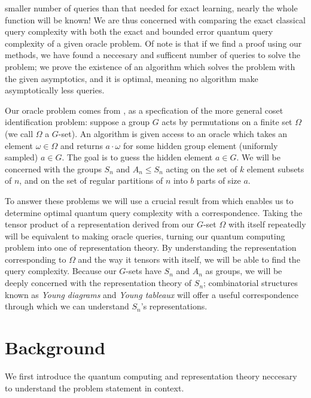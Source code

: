 \documentclass[12pt,twoside]{reedthesis}
\theoremstyle{plain}   %
\theoremstyle{definition}
\theoremstyle{remark}
\numberwithin{equation}{section}
\begin{document}
  smaller number of queries than that needed for exact learning, nearly the whole function will be known!
  We are thus concerned with comparing the exact classical query complexity with both the exact and bounded error quantum query complexity of a given oracle problem.
  Of note is that if we find a proof using our methods, we have found a neccesary and sufficent number of queries to solve the problem;
  we prove the existence of an algorithm which solves the problem with the given asymptotics, and it is optimal,
  meaning no algorithm make asymptotically less queries.
  \par
  Our oracle problem comes from \cite{copeland}, as a specfication of the more general coset identification problem:
  suppose a group $G$ acts by permutations on a finite set $\Omega$ (we call $\Omega$ a $G$-set).
  An algorithm is given access to an oracle which takes an element $\omega \in \Omega$ and returns $a \cdot \omega$ for some hidden group element (uniformly sampled) $a \in G$. The goal is to guess
  the hidden element $a \in G$.
  We will be concerned with the groups $S_n$ and $A_n \leq S_n$ acting on the set of $k$ element subsets of $n$, and on the set of regular partitions of $n$ into $b$ parts of size $a$.
  \par
  To answer these problems we will use a crucial result from \cite{copeland} which enables us to determine optimal quantum query complexity with a correspondence.
  Taking the tensor product of a representation derived from our $G$-set $\Omega$ with itself repeatedly will be equivalent to making oracle queries, turning our quantum computing problem
  into one of representation theory.
  By understanding the representation corresponding to $\Omega$ and the way it tensors with itself, we will be able to find the query complexity.
  Because our $G$-sets have $S_n$ and $A_n$ as groups, we will be deeply concerned with the representation theory of $S_n$;
  combinatorial structures known as \emph{Young diagrams} and \emph{Young tableaux} will offer a useful correspondence through which we can understand $S_n$'s representations.
  
  
  \chapter{Background}
  We first introduce the quantum computing and representation theory neccesary to understand the problem statement in context.
\end{document}
